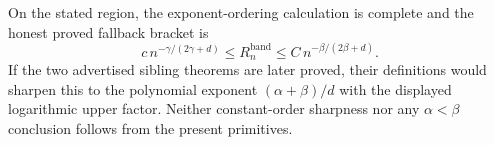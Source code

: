 On the stated region, the exponent-ordering calculation is complete and the honest proved fallback bracket is
\[
c\,n^{-\gamma/(2\gamma+d)}\leq R_n^{\mathrm{band}}\leq
C\,n^{-\beta/(2\beta+d)}.
\]
If the two advertised sibling theorems are later proved, their definitions would sharpen this to the polynomial exponent \((\alpha+\beta)/d\) with the displayed logarithmic upper factor.  Neither constant-order sharpness nor any \(\alpha<\beta\) conclusion follows from the present primitives.